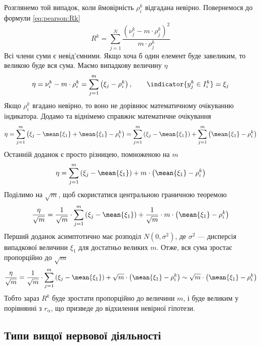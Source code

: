 Розглянемо той випадок, коли ймовірність $\rho_i^k$
відгадана невірно. Повернемося до формули \eqref{eq:pearson:Rk}
\begin{equation*}
  R^k
  = \sum_{j=1}^{N}\frac{\left( \nu_j^k - m \cdot \rho_j^k \right)^2}{m \cdot \rho_j^k}
\end{equation*}
Всі члени суми є невід’ємними. Якщо хоча б один елемент буде завеликим,
то великою буде вся сума. Маємо випадкову величину $\eta$
\begin{equation*}
  \eta
  = \nu_i^k - m \cdot \rho_i^k
  = \sum_{j=1}^{m} \left( \xi_j - \rho_i^k \right),
  \qquad \indicator{y_j^k \in I_i^k} = \xi_j
\end{equation*}
Якщо $\rho_i^k$ вгадано невірно, то воно не дорівнює математичному очікуванню
індикатора. Додамо та віднімемо справжнє математичне очікування
\begin{equation*}
  \eta
  = \sum_{j=1}^{m} \left( \xi_j - \mean{\xi_1} + \mean{\xi_1} - \rho_i^k \right)
  = \sum_{j=1}^{m} \left( \xi_j - \mean{\xi_1} \right)
    + \sum_{j=1}^{m} \left( \mean{\xi_1} - \rho_i^k \right)
\end{equation*}
Останній доданок є просто різницею, помноженою на $m$
\begin{equation*}
  \eta
  = \sum_{j=1}^{m} \left( \xi_j - \mean{\xi_1} \right)
    + m \cdot \left( \mean{\xi_1} - \rho_i^k \right)
\end{equation*}
Поділимо на $\sqrt{m}$, щоб скористатися центральною граничною теоремою
\begin{equation*}
  \frac{\eta}{\sqrt{m}}
  = \frac{1}{\sqrt{m}} \cdot \sum_{j=1}^{m} \left( \xi_j - \mean{\xi_1} \right)
    + \frac{1}{\sqrt{m}} \cdot m \cdot \left( \mean{\xi_1} - \rho_i^k \right)
\end{equation*}
Перший доданок асимптотично має розподіл $N\left( 0, \sigma^2 \right)$, де
$\sigma^2$ --- дисперсія випадкової величини $\xi_1$ для достатньо великих $m$.
Отже, вся сума зростає пропорційно до $\sqrt{m}$
\begin{equation*}
  \frac{\eta}{\sqrt{m}}
  = \frac{1}{\sqrt{m}} \cdot \sum_{j=1}^{m} \left( \xi_j - \mean{\xi_1} \right)
    + \sqrt{m} \cdot \left( \mean{\xi_1} - \rho_i^k \right)
  \sim \sqrt{m} \cdot \left( \mean{\xi_1} - \rho_i^k \right)
\end{equation*}
Тобто зараз $R^k$ буде зростати пропорційно до величини
$m$, і буде великим у порівнянні з $r_{\alpha}$, що призведе до відхилення
невірної гіпотези.

\subsection{Типи вищої нервової діяльності}

